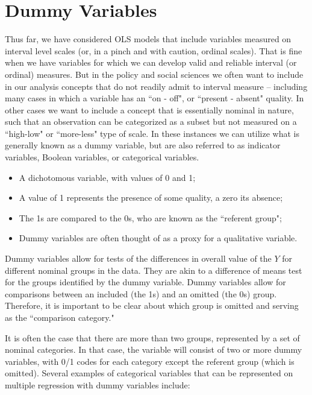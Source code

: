 \documentclass[11pt,openany]{book}\usepackage[]{graphicx}\usepackage[]{color}
\begin{document}
{\section{Dummy Variables} 

Thus far, we have considered OLS models that include variables measured on interval level scales (or, in a pinch and with caution, ordinal scales). That is fine when we have variables for which we can develop valid and reliable interval (or ordinal) measures. But in the policy and social sciences we often want to include in our analysis concepts that do not readily admit to interval measure -- including many cases in which a variable has an ``on - off", or ``present - absent" quality. In other cases we want to include a concept that is essentially nominal in nature, such that an observation can be categorized as a subset but not measured on a ``high-low" or ``more-less" type of scale. In these instances we can utilize what is generally known as a dummy variable, but are also referred to as indicator variables, Boolean variables, or categorical variables.

\begin{grbox}

\begin{itemize}  
\item A dichotomous variable, with values of 0 and 1;
\item A value of 1 represents the presence of some quality, a zero its absence;
\item The 1s are compared to the 0s, who are known as the ``referent group";
\item Dummy variables are often thought of as a proxy for a qualitative variable.
\end{itemize}  
\end{grbox}

Dummy variables allow for tests of the differences in overall value of the $Y$ for different nominal groups in the data. They are akin to a difference of means test for the groups identified by the dummy variable. Dummy variables allow for comparisons between an included (the 1s) and an omitted (the 0s) group. Therefore, it is important to be clear about which group is omitted and serving as the ``comparison category." 

It is often the case that there are more than two groups, represented by a set of nominal categories. In that case, the variable will consist of two or more dummy variables, with 0/1 codes for each category except the referent group (which is omitted). Several examples of categorical variables that can be represented on multiple regression with dummy variables include:

}
\end{document}
